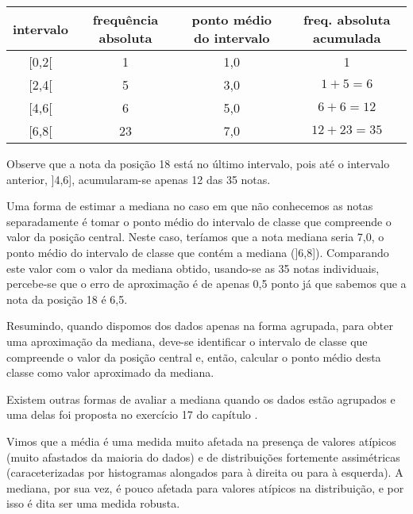 \begin{savenotes}\sphinxattablestart
\centering
{}
\label{\detokenize{PE104-1:id16}}
\sphinxaftercaption
\begin{tabulary}{\linewidth}[t]{|c|c|c|c|}
\hline

intervalo
&
frequência absoluta
&
ponto médio do intervalo
&
freq. absoluta acumulada
\\
\hline
{[}0,2{[}
&
1
&
1,0
&
1
\\
\hline
{[}2,4{[}
&
5
&
3,0
&
$1+5=6$
\\
\hline
{[}4,6{[}
&
6
&
5,0
&
$6+6=12$
\\
\hline
{[}6,8{[}
&
23
&
7,0
&
$12+23=35$
\\
\hline
\end{tabulary}
\par
\sphinxattableend\end{savenotes}

Observe que a nota da posição 18 está no último intervalo, pois até o intervalo anterior, {]}4,6{]}, acumularam-se apenas 12 das 35 notas.

Uma forma de estimar a mediana no caso em que não conhecemos as notas separadamente é tomar o ponto médio do intervalo de classe que compreende o valor da posição central. Neste caso, teríamos que a nota mediana seria 7,0, o ponto médio do intervalo de classe que contém a mediana ({]}6,8{]}). Comparando este valor com o valor da mediana obtido, usando-se as 35 notas individuais, percebe-se que o erro de aproximação é de apenas 0,5 ponto já que sabemos que a nota da posição 18 é 6,5.

Resumindo, quando dispomos dos dados apenas na forma agrupada, para obter uma aproximação da mediana, deve-se identificar o intervalo de classe que compreende o valor da posição central e, então, calcular o ponto médio desta classe como valor aproximado da mediana.

Existem outras formas de avaliar a mediana quando os dados estão agrupados e uma delas foi proposta no exercício 17 do capítulo .


Vimos que a média é uma medida muito afetada na presença de valores atípicos (muito afastados da maioria do dados) e de distribuições fortemente assimétricas (caraceterizadas por histogramas alongados para à direita ou para à esquerda). A mediana, por sua vez, é pouco afetada para valores atípicos na distribuição, e por isso é dita ser uma medida robusta.

